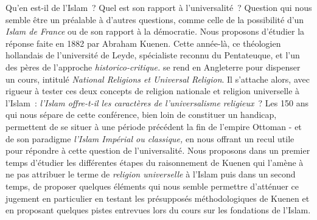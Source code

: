 Qu'en est-il de l'Islam~? Quel est son rapport à l'universalité~?
Question qui nous semble être un préalable à d'autres questions, comme
celle de la possibilité d'un \emph{Islam de France} ou de son rapport à
la démocratie\emph{.} Nous proposons d'étudier la réponse faite en 1882
par Abraham Kuenen. Cette année-là, ce théologien hollandais de
l'université de Leyde, spécialiste reconnu du Pentateuque, et l'un des
pères de l'approche \emph{historico-critique.} se rend en Angleterre
pour dispenser un cours, intitulé \emph{National Religions et Universal
Religion}. Il s'attache alors, avec rigueur à tester ces deux concepts
de religion nationale et religion universelle à l'Islam~: \emph{l'Islam
offre-t-il les caractères de l'universalisme religieux}~? 
Les 150 ans qui nous sépare de cette conférence, bien loin de constituer
un handicap, permettent de se situer à une période précédent la fin de
l'empire Ottoman - et de son paradigme \emph{l'Islam Impérial ou
classique}\emph{,} en nous
offrant un recul utile pour répondre à cette question de
l'universalité\emph{.} Nous proposons dans un premier temps d'étudier
les différentes étapes du raisonnement de Kuenen qui l'amène à ne pas
attribuer le terme de \emph{religion universelle} à l'Islam puis dans un
second temps, de proposer quelques éléments qui nous semble permettre
d'atténuer ce jugement en particulier en testant les présupposés
méthodologiques de Kuenen et en proposant quelques pistes entrevues lors
du cours sur les fondations de l'Islam.

